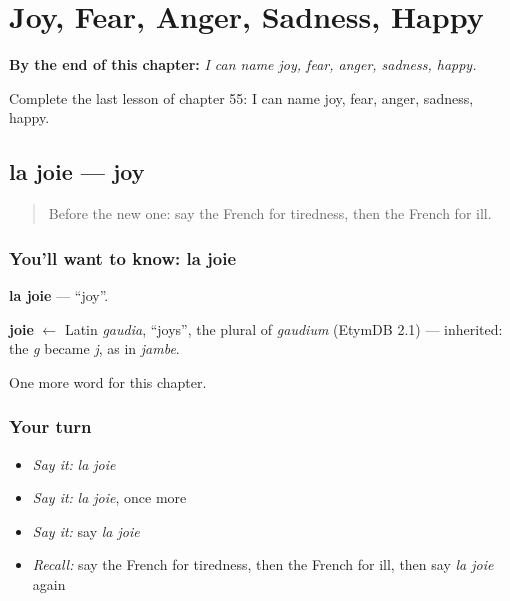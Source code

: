 
\chapter{Joy, Fear, Anger, Sadness, Happy}
\label{ch:fr-joy-fear-anger-sadness-happy}

\begin{chapteropening}
\textbf{By the end of this chapter:} \emph{I can name joy, fear, anger, sadness, happy.}

Complete the last lesson of chapter 55: I can name joy, fear, anger, sadness, happy.
\end{chapteropening}

\section[la joie]{la joie — joy}

\label{lesson:FR-C55-joie}



\begin{quote}
Before the new one: say the French for tiredness, then the French for ill.
\end{quote}

\subsection*{You'll want to know: la joie}
\textbf{la joie} — \textquotedblleft{}joy\textquotedblright{}.

\begin{cousinweb}
\textbf{joie} $\leftarrow$ Latin \emph{gaudia}, \textquotedblleft{}joys\textquotedblright{}, the plural of \emph{gaudium} (EtymDB 2.1) — inherited: the \emph{g} became \emph{j}, as in \emph{jambe}.
\end{cousinweb}

\begin{grammarlens}[title={What you've built}]
One more word for this chapter.
\end{grammarlens}

\subsection*{Your turn}
\begin{itemize}
\raggedright
  \item \emph{Say it:} \emph{la joie}
  \item \emph{Say it:} \emph{la joie}, once more
  \item \emph{Say it:} say \emph{la joie}
  \item \emph{Recall:} say the French for tiredness, then the French for ill, then say \emph{la joie} again
\end{itemize}

